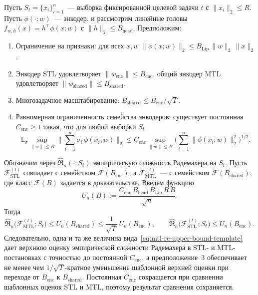\begin{theorem}\label{thm:per-task-rc-fair-scaling}
Пусть $S_t=\{x_i\}_{i=1}^n$~--- выборка фиксированной целевой задачи $t$ с $\|x_i\|_2 \le R$.
Пусть $\phi(\cdot;w)$~--- энкодер, и рассмотрим линейные головы
$f_{w,h}(x)=h^\top \phi(x;w)$ с $\|h\|_2 \le B_{\mathrm{head}}$.
Предположим:
\begin{enumerate}
\item Ограничение на признаки: для всех $x,w$
$\|\phi(x;w)\|_2 \le B_{\mathrm{Lip}}\,\|w\|_2\,\|x\|_2$.
\item Энкодер STL удовлетворяет $\|w_{\mathrm{enc}}\|\le B_{\mathrm{enc}}$,
общий энкодер MTL удовлетворяет $\|w_{\mathrm{shared}}\|\le B_{\mathrm{shared}}$.
\item Многозадачное масштабирование: $B_{\mathrm{shared}} \le B_{\mathrm{enc}}/\sqrt{T}$.
\item Равномерная ограниченность семейства энкодеров: существует постоянная
$C_{\mathrm{enc}}\ge1$ такая, что для любой выборки $S_t$
\begin{equation}\label{eq:enc-cover}
\mathbb{E}_{\sigma}\sup_{\|w\|\le B}
\Big\|\sum_{i=1}^{n}\sigma_i\,\phi(x_i;w)\Big\|_2
\le
C_{\mathrm{enc}}\sup_{\|w\|\le B}
\Big(\sum_{i=1}^{n}\|\phi(x_i;w)\|_2^2\Big)^{1/2}.
\end{equation}
\end{enumerate}

Обозначим через $\widehat{\mathfrak R}_n(\cdot;S_t)$ эмпирическую сложность Радемахера на $S_t$.
Пусть $\mathcal{F}_{\mathrm{STL}}^{(t)}$ совпадает с семейством $\mathcal{F}(B_{\mathrm{enc}})$, а $\mathcal{F}_{\mathrm{MTL}}^{(t)}$~--- с семейством $\mathcal{F}(B_{\mathrm{shared}})$, где класс $\mathcal{F}(B)$ задается в доказательстве.
Введем функцию
\begin{equation}\label{eq:mtl-rc-upper-bound-template}
U_n(B) := \frac{C_{\mathrm{enc}}\,B_{\mathrm{head}}\,B_{\mathrm{Lip}}\,R\,B}{\sqrt{n}}.
\end{equation}
Тогда
\begin{equation}\label{eq:mtl-vs-stl-rc}
\widehat{\mathfrak R}_n\!\big(\mathcal{F}_{\mathrm{MTL}}^{(t)};S_t\big)\le U_n(B_{\mathrm{shared}})\le \frac{1}{\sqrt{T}}\,U_n(B_{\mathrm{enc}}),
\qquad
\widehat{\mathfrak R}_n\!\big(\mathcal{F}_{\mathrm{STL}}^{(t)};S_t\big)\le U_n(B_{\mathrm{enc}}).
\end{equation}
Следовательно, одна и та же величина вида~\eqref{eq:mtl-rc-upper-bound-template} дает верхнюю оценку эмпирической сложности Радемахера в STL- и MTL-постановках с точностью до постоянной $C_{\mathrm{enc}}$, а предположение~3 обеспечивает не менее чем $1/\sqrt{T}$-кратное уменьшение шаблонной верхней оценки при переходе от $B_{\mathrm{enc}}$ к $B_{\mathrm{shared}}$. Постоянная $C_{\mathrm{enc}}$ сокращается при сравнении шаблонных оценок STL и MTL, поэтому результат сравнения сохраняется.
\end{theorem}
